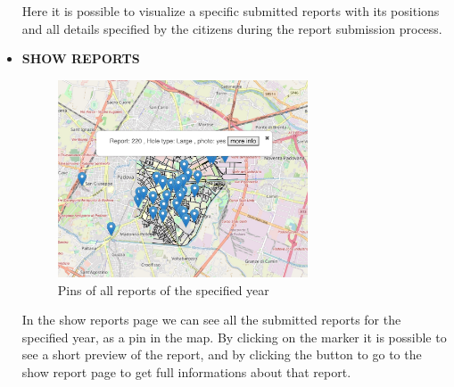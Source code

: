 \begin{itemize}
    Here it is possible to visualize a specific submitted reports with its positions and all details specified by the citizens during the report submission process.
    
    \item \textbf{SHOW REPORTS}
    \begin{figure}[h]
        \centering
        \includegraphics[width=0.7\textwidth]{images/show_reports.jpeg}
        \caption{Pins of all reports of the specified year}
        \label{fig:yourlabel}
    \end{figure}
    In the show reports page we can see all the submitted reports for the specified year, as a pin in the map. By clicking on the marker it is possible to see a short preview of the report, and by clicking the button to go to the show report page to get full informations about that report.
\end{itemize}

\newpage
